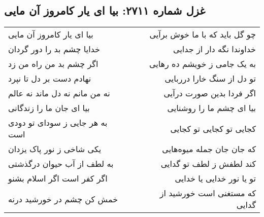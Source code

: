 \begin{center}
\section*{غزل شماره ۲۷۱۱: بیا ای یار کامروز آن مایی}
\label{sec:2711}
\begin{longtable}{l p{0.5cm} r}
بیا ای یار کامروز آن مایی
&&
چو گل باید که با ما خوش برآیی
\\
خدایا چشم بد را دور گردان
&&
خداوندا نگه دار از جدایی
\\
اگر چشم بد من راه من زد
&&
به یک جامی ز خویشم ده رهایی
\\
نهادم دست بر دل تا نپرد
&&
تو دل از سنگ خارا درربایی
\\
نه من مانم نه دل ماند نه عالم
&&
اگر فردا بدین صورت درآیی
\\
بیا ای جان ما را زندگانی
&&
بیا ای چشم ما را روشنایی
\\
به هر جایی ز سودای تو دودی است
&&
کجایی تو کجایی تو کجایی
\\
یکی شاخی ز نور پاک یزدان
&&
که جان جان جمله میوه‌هایی
\\
به لطف از آب حیوان درگذشتی
&&
کند لطفش ز لطف تو گدایی
\\
اگر کفر است اگر اسلام بشنو
&&
تو یا نور خدایی یا خدایی
\\
خمش کن چشم در خورشید درنه
&&
که مستغنی است خورشید از گدایی
\\
\end{longtable}
\end{center}
